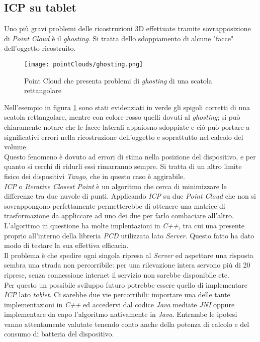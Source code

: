 \subsection{ICP su tablet}
Uno più gravi problemi delle ricostruzioni 3D effettuate tramite sovrapposizione di \emph{Point Cloud} è il \emph{ghosting}. Si tratta dello sdoppiamento di alcune "facce" dell'oggetto ricostruito.\\
\begin{figure}[!h] 
    \centering 
    \texttt{[image: pointClouds/ghosting.png]} 
    \caption{Point Cloud che presenta problemi di \emph{ghosting} di una scatola rettangolare}
    \label{figure:pcloud_ghosting}
\end{figure}
Nell'esempio in figura \ref{figure:pcloud_ghosting} sono stati evidenziati in verde gli spigoli corretti di una scatola rettangolare, mentre con colore rosso quelli dovuti al \emph{ghosting}; si può chiaramente notare che le facce laterali appaiosno sdoppiate e ciò può portare a significativi errori nella ricostruzione dell'oggetto e soprattutto nel calcolo del volume.\\
Questo fenomeno è dovuto ad errori di stima nella posizione del dispositivo, e per quanto si cerchi di ridurli essi rimarranno sempre. Si tratta di un altro limite fisico dei dispositivi \emph{Tango}, che in questo caso è aggirabile.\\
\emph{ICP} o \emph{Iterative Closest Point} è un algoritmo che cerca di minimizzare le differenze tra due nuvole di punti. Applicando \emph{ICP} su due \emph{Point Cloud} che non si sovrappongono perfettamente permetterebbe di ottenere una matrice di trasformazione da appliccare ad uno dei due per farlo combaciare all'altro. L'algoritmo in questione ha molte implentazioni in \emph{C++}, tra cui una presente proprio all'interno della libreria \emph{PCD} utilizzata lato \emph{Server}. Questo fatto ha dato modo di testare la sua effettiva efficacia.\\
Il problema è che spedire ogni singola ripresa al \emph{Server} ed aspettare una risposta sembra una strada non percorribile: per una rilevazione intera servono più di 20 riprese, senza connessione internet il servizio non sarebbe disponibile etc.\\
Per questo un possibile sviluppo futuro potrebbe essere quello di implementare \emph{ICP} lato \emph{tablet}. Ci sarebbe due vie percorribili: importare una delle tante implementazioni in \emph{C++} ed accedervi dal codice \emph{Java} mediate \emph{JNI} oppure implementare da capo l'algoritmo nativamente in \emph{Java}. Entrambe le ipotesi vanno attentamente valutate tenendo conto anche della potenza di calcolo e del consumo di batteria del dispositivo.

